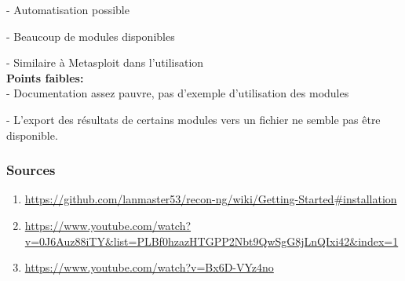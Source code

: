 - Automatisation possible

- Beaucoup de modules disponibles

- Similaire à Metasploit dans l'utilisation \\

{\bfseries Points faibles:} \\

- Documentation assez pauvre, pas d'exemple d'utilisation des modules

- L'export des résultats de certains modules vers un fichier ne semble pas être disponible.

\subsubsection{Sources}
\begin{enumerate}
  \item \url{https://github.com/lanmaster53/recon-ng/wiki/Getting-Started#installation}
  \item \url{https://www.youtube.com/watch?v=0J6Auz88iTY&list=PLBf0hzazHTGPP2Nbt9QwSgG8jLnQIxi42&index=1}
  \item \url{https://www.youtube.com/watch?v=Bx6D-VYz4no}
\end{enumerate}